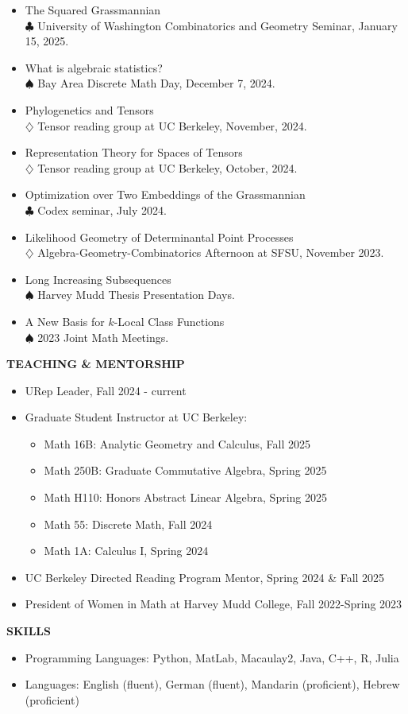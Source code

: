 \documentclass[11pt]{article}
\newcommand{\hdr}[1]{\textcolor{blue(ryb)}{\textbf{#1}}}
\begin{document}
\begin{itemize}
\item The Squared Grassmannian\\
  $\clubsuit$ University of Washington Combinatorics and Geometry Seminar, January 15, 2025.
\item What is algebraic statistics?\\
  $\spadesuit$ Bay Area Discrete Math Day, December 7, 2024. 
\item Phylogenetics and Tensors\\
  $\diamondsuit$ Tensor reading group at UC Berkeley, November, 2024. 
\item Representation Theory for Spaces of Tensors\\
  $\diamondsuit$ Tensor reading group at UC Berkeley, October, 2024. 
\item Optimization over Two Embeddings of the Grassmannian\\
  $\clubsuit$ Codex seminar, July 2024. 
\item Likelihood Geometry of Determinantal Point Processes\\
  $\diamondsuit$ Algebra-Geometry-Combinatorics Afternoon at SFSU, November 2023.
\item Long Increasing Subsequences\\
  $\spadesuit$ Harvey Mudd Thesis Presentation Days.
\item A New Basis for $k$-Local Class Functions\\
  $\spadesuit$ 2023 Joint Math Meetings.
\end{itemize}

\bigskip


\hdr{TEACHING \& MENTORSHIP}\\
\begin{itemize}
\item URep Leader, Fall 2024 - current
\item Graduate Student Instructor at UC Berkeley:
  \begin{itemize}
  \item Math 16B: Analytic Geometry and Calculus, Fall 2025
  \item Math 250B: Graduate Commutative Algebra, Spring 2025
  \item Math H110: Honors Abstract Linear Algebra, Spring 2025
  \item Math 55: Discrete Math, Fall 2024
  \item Math 1A: Calculus I, Spring 2024
  \end{itemize}
\item UC Berkeley Directed Reading Program Mentor, Spring 2024 \& Fall 2025
\item President of Women in Math at Harvey Mudd College, Fall 2022-Spring 2023
\end{itemize}

\bigskip

\hdr{SKILLS}\\
\begin{itemize}
\item 
Programming Languages: Python, MatLab, Macaulay2, Java, C++, R, Julia\\
\item 
Languages: English (fluent), German (fluent), Mandarin (proficient), Hebrew (proficient)
\end{itemize}
\end{document}

